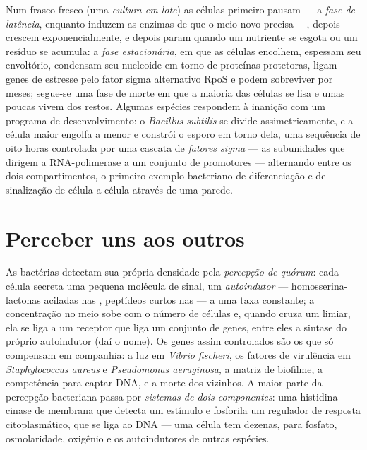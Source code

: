\begin{definition}\label{def:b3:bacteriology:phases}
Num frasco fresco (uma \emph{cultura em lote}) as células primeiro
pausam --- a \emph{fase de latência}, enquanto induzem as enzimas de
que o meio novo precisa ---, depois crescem exponencialmente, e depois
param quando um nutriente se esgota ou um resíduo se acumula: a
\emph{fase estacionária}, em que as células encolhem, espessam seu
envoltório, condensam seu nucleoide em torno de proteínas protetoras,
ligam genes de estresse pelo fator sigma alternativo RpoS e podem
sobreviver por meses; segue-se uma fase de morte em que a maioria das
células se lisa e umas poucas vivem dos restos. Algumas espécies
respondem à inanição com um programa de desenvolvimento: o
\emph{Bacillus subtilis} se divide assimetricamente, e a célula maior
engolfa a menor e constrói o esporo em torno dela, uma sequência de
oito horas controlada por uma cascata de \emph{fatores sigma} --- as
subunidades que dirigem a RNA-polimerase a um conjunto de promotores
--- alternando entre os dois compartimentos, o primeiro exemplo
bacteriano de diferenciação e de sinalização de célula a célula através
de uma parede.
\end{definition}

\section{Perceber uns aos outros}

\begin{definition}\label{def:b3:bacteriology:quorum}
As bactérias detectam sua própria densidade pela \emph{percepção de
quórum}: cada célula secreta uma pequena molécula de sinal, um
\emph{autoindutor} --- homosserina-lactonas aciladas nas
, peptídeos curtos nas  --- a uma taxa
constante; a concentração no meio sobe com o número de células e,
quando cruza um limiar, ela se liga a um receptor que liga um conjunto
de genes, entre eles a sintase do próprio autoindutor (daí o nome). Os
genes assim controlados são os que só compensam em companhia: a luz em
\emph{Vibrio fischeri}, os fatores de virulência em
\emph{Staphylococcus aureus} e \emph{Pseudomonas aeruginosa}, a matriz
de biofilme, a competência para captar DNA, e a morte dos vizinhos. A
maior parte da percepção bacteriana passa por \emph{sistemas de dois
componentes}: uma histidina-cinase de membrana que detecta um estímulo
e fosforila um regulador de resposta citoplasmático, que se liga ao DNA
--- uma célula tem dezenas, para fosfato, osmolaridade, oxigênio e os
autoindutores de outras espécies.
\end{definition}

